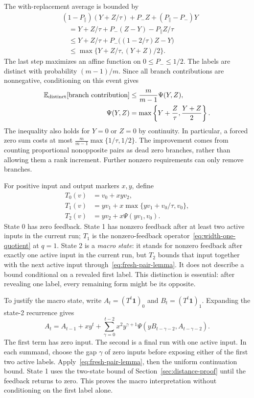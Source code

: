 The with-replacement average is bounded by
\nopagebreak
\[
\begin{aligned}
 &(1-P_\parallel)(Y+Z/\tau)+P_- Z+(P_\parallel-P_-)Y\\
 &\quad=Y+Z/\tau+P_-(Z-Y)-P_\parallel Z/\tau\\
 &\quad\le Y+Z/\tau+P_-\bigl((1-2/\tau)Z-Y\bigr)\\
 &\quad\le\max\{Y+Z/\tau,(Y+Z)/2\}.
\end{aligned}
\]
The last step maximizes an affine function on $0\le P_-\le1/2$.
The labels are distinct with probability $(m-1)/m$. Since all branch
contributions are nonnegative, conditioning on this event gives
\begin{equation}\label{eq:fresh-pair-lemma}
 \begin{aligned}
 \mathbb E_{\rm distinct}[\text{branch contribution}]
 &\le\frac{m}{m-1}\Psi(Y,Z),\\
 \Psi(Y,Z)&=\max\left\{Y+\frac Z\tau,\frac{Y+Z}{2}\right\}.
 \end{aligned}
\end{equation}
The inequality also holds for $Y=0$ or $Z=0$ by continuity. In particular,
a forced zero sum costs at most
$\frac{m}{m-1}\max\{1/\tau,1/2\}$. The improvement comes from counting
proportional nonopposite pairs as dead zero branches, rather than allowing
them a rank increment. Further nonzero requirements can only remove branches.

For positive input and output markers $x,y$, define
\begin{align*}
 T_0(v)&=v_0+xyv_2,\\
 T_1(v)&=yv_1+x\max\{yv_1+v_0/\tau,v_0\},\\
 T_2(v)&=yv_2+x\Psi(yv_1,v_0).
\end{align*}
State 0 has zero feedback. State 1 has nonzero feedback after at least
two active inputs in the current run; $T_1$ is the nonzero-feedback
operator~\eqref{eq:width-one-quotient} at $q=1$.
State 2 is a \emph{macro state}: it stands for nonzero feedback after
exactly one active input in the current run, but $T_2$ bounds that input
together with the next active input through~\eqref{eq:fresh-pair-lemma}.
It does not describe a bound conditional on a revealed first label.
This distinction is essential: after revealing one label, every remaining
form might be its opposite.

To justify the macro state, write $A_t=(T^t\mathbf1)_0$ and
$B_t=(T^t\mathbf1)_1$. Expanding the state-2 recurrence gives
\[
 A_t=A_{t-1}+xy^t+
 \sum_{\gamma=0}^{t-2}x^2y^{\gamma+1}
 \Psi(yB_{t-\gamma-2},A_{t-\gamma-2}).
\]
The first term has zero input. The second is a final run with one
active input. In each summand, choose the gap $\gamma$ of zero inputs
before exposing either of the first two active labels.
Apply~\eqref{eq:fresh-pair-lemma}, then the uniform continuation bound.
State 1 uses the two-state bound of Section~\ref{sec:distance-proof}
until the feedback returns to zero. This proves the macro interpretation
without conditioning on the first label alone.

